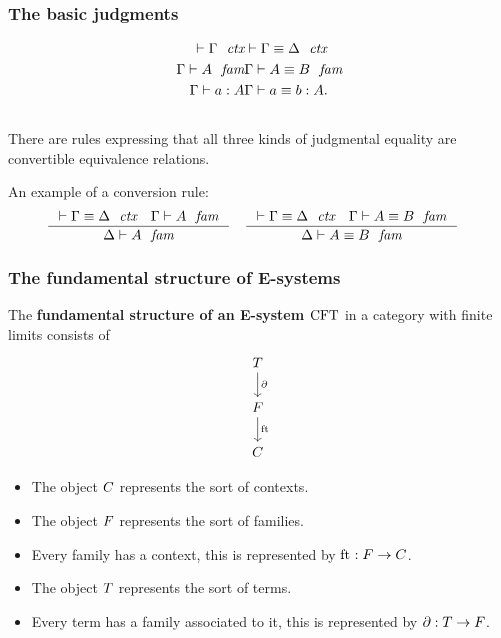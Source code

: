 \documentclass{beamer}
\newcommand\important[1]{\textbf{\color{red!90!black}#1}}
\begin{document}
\begin{frame}
\frametitle{\bf The basic judgments}
\begin{align*}
\jalign\jctx{\Gamma} 
& \jalign\jctxeq{\Gamma}{\Delta}
  \\
\jalign\jfam{\Gamma}{A} 
& \jalign\jfameq{\Gamma}{A}{B}
  \\
\jalign\jterm{\Gamma}{A}{a} 
& \jalign\jtermeq{\Gamma}{A}{a}{b}.
\end{align*}
\\[\baselineskip]
There are rules expressing that all three kinds of judgmental equality are
convertible equivalence relations.

\pause
An example of a conversion rule:
\begin{align*}
& \inference
  { \jctxeq{\Gamma}{\Delta}
    \jfam{\Gamma}{A}
    }
  { \jfam{\Delta}{A}
    }
& & \inference
    { \jctxeq{\Gamma}{\Delta}
      \jfameq{\Gamma}{A}{B}
      }
    { \jfameq{\Delta}{A}{B}
      }
\end{align*}
\end{frame}

\begin{frame}
\frametitle{\bf The fundamental structure of E-systems}
The \important{fundamental structure of an E-system $\mathrm{CFT}$} in a category with finite limits consists of
\begin{equation*}
\begin{tikzcd}
\stesyst
  \ar{d}{\ebd}
  \\
\stesysf
  \ar{d}{\eft}
  \\
\stesysc
\end{tikzcd}
\end{equation*}
\pause
\begin{itemize}
\item The object $C$ represents the sort of contexts.
\pause
\item The object $F$ represents the sort of families.
\pause
\item Every family has a context, this is represented by $\mathrm{ft}_{}:F\to C$.
\pause
\item The object $T$ represents the sort of terms.
\pause
\item Every term has a family associated to it, this is represented by
$\partial_{}:T\to F$.
\end{itemize}
\end{frame}
\end{document}
